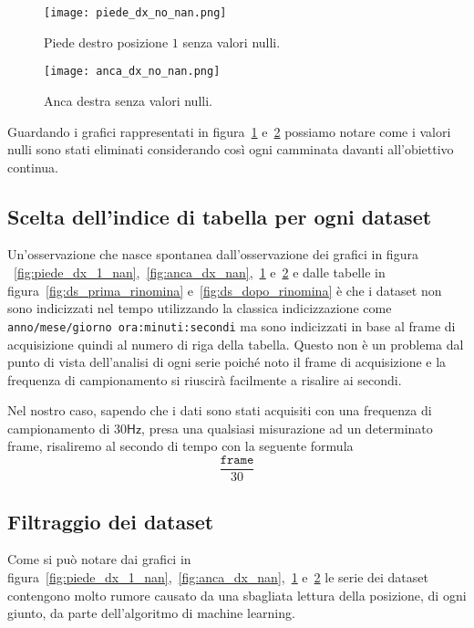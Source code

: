 \begin{figure}[H]
    \centering
    \texttt{[image: piede\_dx\_no\_nan.png]}
    \caption{Piede destro posizione $1$ senza valori nulli.}
    \label{fig:piede_dx_1_no_nan}
\end{figure}

\begin{figure}[H]
    \centering
    \texttt{[image: anca\_dx\_no\_nan.png]}
    \caption{Anca destra senza valori nulli.}
    \label{fig:anca_dx_no_nan}
\end{figure}

Guardando i grafici rappresentati in figura~\ref{fig:piede_dx_1_no_nan} e~\ref{fig:anca_dx_no_nan}
possiamo notare come i valori nulli sono stati eliminati considerando così ogni camminata 
davanti all'obiettivo continua.


\subsection{Scelta dell'indice di tabella per ogni dataset}
Un'osservazione che nasce spontanea dall'osservazione dei grafici in figura
~\ref{fig:piede_dx_1_nan},~\ref{fig:anca_dx_nan},~\ref{fig:piede_dx_1_no_nan}
e~\ref{fig:anca_dx_no_nan} e dalle tabelle in figura~\ref{fig:ds_prima_rinomina}
e~\ref{fig:ds_dopo_rinomina} è che i dataset non sono indicizzati nel tempo utilizzando
la classica indicizzazione come \texttt{anno/mese/giorno ora:minuti:secondi} ma sono indicizzati
in base al frame di acquisizione quindi al numero di riga della tabella.
Questo non è un problema dal punto di vista dell'analisi di ogni serie poiché noto il frame
di acquisizione e la frequenza di campionamento si riuscirà facilmente a risalire ai secondi.

Nel nostro caso, sapendo che i dati sono stati acquisiti con una frequenza di campionamento di 
$30\mathsf{Hz}$, presa una qualsiasi misurazione ad un determinato frame, risaliremo al secondo
di tempo con la seguente formula
\[\frac{\texttt{frame}}{30} \]


\subsection{Filtraggio dei dataset}
Come si può notare dai grafici in figura~\ref{fig:piede_dx_1_nan},~\ref{fig:anca_dx_nan},~\ref{fig:piede_dx_1_no_nan}
e~\ref{fig:anca_dx_no_nan} le serie dei dataset contengono molto rumore causato da una sbagliata 
lettura della posizione, di ogni giunto, da parte dell'algoritmo di machine learning.

